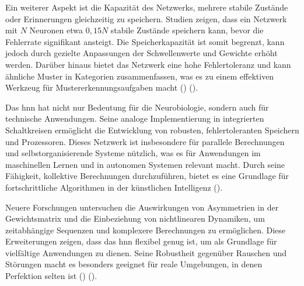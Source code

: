 Ein weiterer Aspekt ist die Kapazität des Netzwerks, mehrere stabile Zustände oder Erinnerungen gleichzeitig zu speichern. Studien zeigen, dass ein Netzwerk mit \(N\) Neuronen etwa \(0,15N\) stabile Zustände speichern kann, bevor die Fehlerrate signifikant ansteigt. Die Speicherkapazität ist somit begrenzt, kann jedoch durch gezielte Anpassungen der Schwellenwerte und Gewichte erhöht werden. Darüber hinaus bietet das Netzwerk eine hohe Fehlertoleranz und kann ähnliche Muster in Kategorien zusammenfassen, was es zu einem effektiven Werkzeug für Mustererkennungsaufgaben macht (\cite[vgl. S. 2556]{Hopfield1982}) (\cite[vgl. S. 3091]{Hopfield1984}).

Das \ac{hnn} hat nicht nur Bedeutung für die Neurobiologie, sondern auch für technische Anwendungen. Seine analoge Implementierung in integrierten Schaltkreisen ermöglicht die Entwicklung von robusten, fehlertoleranten Speichern und Prozessoren. Dieses Netzwerk ist insbesondere für parallele Berechnungen und selbstorganisierende Systeme nützlich, was es für Anwendungen im maschinellen Lernen und in autonomen Systemen relevant macht. Durch seine Fähigkeit, kollektive Berechnungen durchzuführen, bietet es eine Grundlage für fortschrittliche Algorithmen in der künstlichen Intelligenz (\cite[vgl. S. 2554 ff.]{Hopfield1982}).

Neuere Forschungen untersuchen die Auswirkungen von Asymmetrien in der Gewichtsmatrix und die Einbeziehung von nichtlinearen Dynamiken, um zeitabhängige Sequenzen und komplexere Berechnungen zu ermöglichen. Diese Erweiterungen zeigen, dass das \ac{hnn} flexibel genug ist, um als Grundlage für vielfältige Anwendungen zu dienen. Seine Robustheit gegenüber Rauschen und Störungen macht es besonders geeignet für reale Umgebungen, in denen Perfektion selten ist (\cite[vgl. S. 2557]{Hopfield1982}) (\cite[vgl. S. 3092]{Hopfield1984}).
